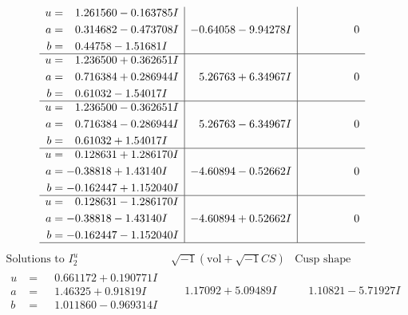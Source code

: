 \documentclass[1p]{elsarticle_modified}
\theoremstyle{definition}
\newcommand{\I}{\sqrt{-1}}
\begin{document}
$$\begin{array}{c|c|c}
\begin{aligned}
u &= \phantom{-}1.261560 - 0.163785 I \\
a &= \phantom{-}0.314682 - 0.473708 I \\
b &= \phantom{-}0.44758 - 1.51681 I\end{aligned}
 & -0.64058 - 9.94278 I & \phantom{-0.000000 } 0 \\ \hline\begin{aligned}
u &= \phantom{-}1.236500 + 0.362651 I \\
a &= \phantom{-}0.716384 + 0.286944 I \\
b &= \phantom{-}0.61032 - 1.54017 I\end{aligned}
 & \phantom{-}5.26763 + 6.34967 I & \phantom{-0.000000 } 0 \\ \hline\begin{aligned}
u &= \phantom{-}1.236500 - 0.362651 I \\
a &= \phantom{-}0.716384 - 0.286944 I \\
b &= \phantom{-}0.61032 + 1.54017 I\end{aligned}
 & \phantom{-}5.26763 - 6.34967 I & \phantom{-0.000000 } 0 \\ \hline\begin{aligned}
u &= \phantom{-}0.128631 + 1.286170 I \\
a &= -0.38818 + 1.43140 I \\
b &= -0.162447 + 1.152040 I\end{aligned}
 & -4.60894 - 0.52662 I & \phantom{-0.000000 } 0 \\ \hline\begin{aligned}
u &= \phantom{-}0.128631 - 1.286170 I \\
a &= -0.38818 - 1.43140 I \\
b &= -0.162447 - 1.152040 I\end{aligned}
 & -4.60894 + 0.52662 I & \phantom{-0.000000 } 0\\
 \hline 
 \end{array}$$\newpage$$\begin{array}{c|c|c}  
\text{Solutions to }I^u_{2}& \I (\text{vol} + \sqrt{-1}CS) & \text{Cusp shape}\\
 \hline 
\begin{aligned}
u &= \phantom{-}0.661172 + 0.190771 I \\
a &= \phantom{-}1.46325 + 0.91819 I \\
b &= \phantom{-}1.011860 - 0.969314 I\end{aligned}
 & \phantom{-}1.17092 + 5.09489 I & \phantom{-}1.10821 - 5.71927 I \\ \hline\begin{aligned}

\end{aligned}
\end{array}$$
\end{document}
